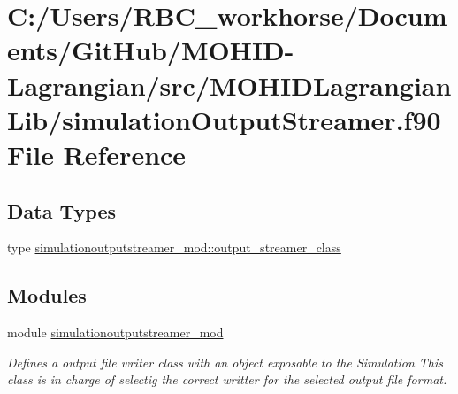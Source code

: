 \hypertarget{simulation_output_streamer_8f90}{}\section{C\+:/\+Users/\+R\+B\+C\+\_\+workhorse/\+Documents/\+Git\+Hub/\+M\+O\+H\+I\+D-\/\+Lagrangian/src/\+M\+O\+H\+I\+D\+Lagrangian\+Lib/simulation\+Output\+Streamer.f90 File Reference}
\label{simulation_output_streamer_8f90}
\subsection*{Data Types}
\begin{DoxyCompactItemize}
\item 
type \mbox{\hyperlink{structsimulationoutputstreamer__mod_1_1output__streamer__class}{simulationoutputstreamer\+\_\+mod\+::output\+\_\+streamer\+\_\+class}}
\end{DoxyCompactItemize}
\subsection*{Modules}
\begin{DoxyCompactItemize}
\item 
module \mbox{\hyperlink{namespacesimulationoutputstreamer__mod}{simulationoutputstreamer\+\_\+mod}}
\begin{DoxyCompactList}\small\item\em Defines a output file writer class with an object exposable to the Simulation This class is in charge of selectig the correct writter for the selected output file format. \end{DoxyCompactList}\end{DoxyCompactItemize}
